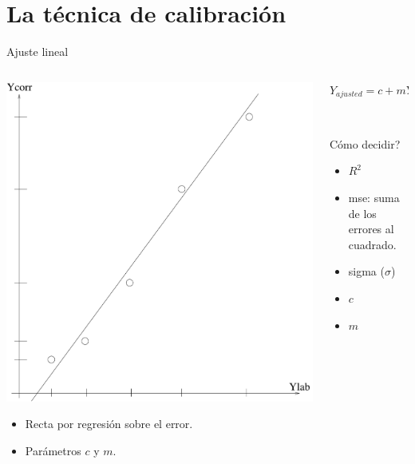 \documentclass{beamer}
\begin{document}
\section{La técnica de calibración}


\begin{frame}{Ajuste lineal}
 
 \begin{columns}
  \begin{column}{5cm}
   \includegraphics[scale=.25]{tuining}
   \begin{itemize}
    \item Recta por regresión sobre el error.
    \item Parámetros $c$ y $m$.
   \end{itemize}
  \end{column}
  \begin{column}{5cm}
   $Y_{ajusted} = c + m Y_{corr}$
   
    ~\

   Cómo decidir?
    \begin{itemize}
     \item $R^2$
     \item mse: suma de los errores al cuadrado.
     \item sigma ($\sigma$)
     \item $c$
     \item $m$
    \end{itemize}
  \end{column}
 \end{columns}
\end{frame}
\end{document}
